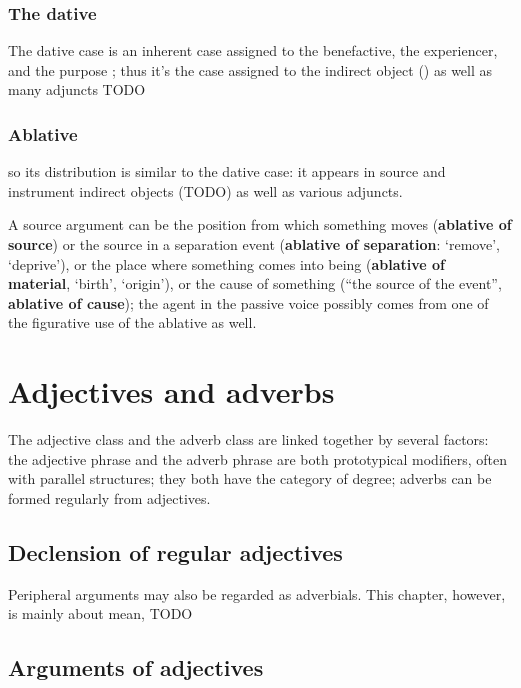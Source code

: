 \documentclass[a4paper, oneside, 12pt]{report}
\newcommand*{\citepage}[1]{p.~{#1}}
\newcommand*{\concept}[1]{\textbf{#1}}
\newcommand{\translate}[1]{`#1'}
\begin{document}
\subsection{The dative}\label{sec:dative-distribution}

The dative case is an inherent case assigned to the benefactive, the experiencer, and the purpose
\citep[\citepage{251}]{oniga2014latin};
thus it's the case assigned to the indirect object ()
as well as many adjuncts TODO

\subsection{Ablative}

so its distribution is similar to the dative case: 
it appears in source and instrument indirect objects (TODO) 
as well as various adjuncts.

A source argument
can be the position from which something moves 
(\concept{ablative of source})
or the source in a separation event 
(\concept{ablative of separation}: \translate{remove}, \translate{deprive}),
or the place where something comes into being 
(\concept{ablative of material}, \translate{birth}, \translate{origin}), 
or the cause of something (``the source of the event'', \concept{ablative of cause});
the agent in the passive voice possibly 
comes from one of the figurative use of the ablative as well.

\chapter{Adjectives and adverbs}

The adjective class and the adverb class are linked together by several factors:
the adjective phrase and the adverb phrase are both prototypical modifiers,
often with parallel structures;
they both have the category of degree; 
adverbs can be formed regularly from adjectives.

\section{Declension of regular adjectives}

Peripheral arguments may also be regarded as adverbials.
This chapter, however, is mainly about mean, TODO

\section{Arguments of adjectives}
\end{document}
